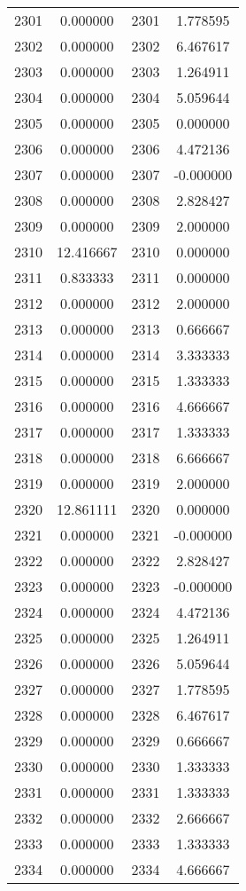 \documentclass[12pt]{article}
\begin{document}
\begin{longtable}{@{}cccc@{}}
2301 & 0.000000 & 2301 & 1.778595 \\
2302 & 0.000000 & 2302 & 6.467617 \\
2303 & 0.000000 & 2303 & 1.264911 \\
2304 & 0.000000 & 2304 & 5.059644 \\
2305 & 0.000000 & 2305 & 0.000000 \\
2306 & 0.000000 & 2306 & 4.472136 \\
2307 & 0.000000 & 2307 & -0.000000 \\
2308 & 0.000000 & 2308 & 2.828427 \\
2309 & 0.000000 & 2309 & 2.000000 \\
2310 & 12.416667 & 2310 & 0.000000 \\
2311 & 0.833333 & 2311 & 0.000000 \\
2312 & 0.000000 & 2312 & 2.000000 \\
2313 & 0.000000 & 2313 & 0.666667 \\
2314 & 0.000000 & 2314 & 3.333333 \\
2315 & 0.000000 & 2315 & 1.333333 \\
2316 & 0.000000 & 2316 & 4.666667 \\
2317 & 0.000000 & 2317 & 1.333333 \\
2318 & 0.000000 & 2318 & 6.666667 \\
2319 & 0.000000 & 2319 & 2.000000 \\
2320 & 12.861111 & 2320 & 0.000000 \\
2321 & 0.000000 & 2321 & -0.000000 \\
2322 & 0.000000 & 2322 & 2.828427 \\
2323 & 0.000000 & 2323 & -0.000000 \\
2324 & 0.000000 & 2324 & 4.472136 \\
2325 & 0.000000 & 2325 & 1.264911 \\
2326 & 0.000000 & 2326 & 5.059644 \\
2327 & 0.000000 & 2327 & 1.778595 \\
2328 & 0.000000 & 2328 & 6.467617 \\
2329 & 0.000000 & 2329 & 0.666667 \\
2330 & 0.000000 & 2330 & 1.333333 \\
2331 & 0.000000 & 2331 & 1.333333 \\
2332 & 0.000000 & 2332 & 2.666667 \\
2333 & 0.000000 & 2333 & 1.333333 \\
2334 & 0.000000 & 2334 & 4.666667 \\

\end{longtable}
\end{document}
